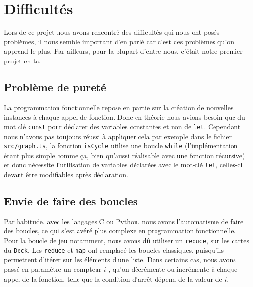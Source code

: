 \section{Difficultés}

Lors de ce projet nous avons rencontré des difficultés qui nous ont posés problèmes, il nous semble important d'en parlé car c'est des problèmes qu'on apprend le plus. Par ailleurs, pour la plupart d'entre nous, c'était notre premier projet en ts.

\subsection{Problème de pureté}

La programmation fonctionnelle repose en partie sur la création de nouvelles instances à chaque appel de fonction. Donc en théorie nous avions besoin que du mot clé \texttt{const} pour déclarer des variables constantes et non de \texttt{let}. Cependant nous n'avons pas toujours réussi à appliquer cela par exemple dans le fichier \texttt{src/graph.ts}, la fonction \texttt{isCycle} utilise une boucle \texttt{while} (l'implémentation étant plus simple comme ça, bien qu'aussi réalisable avec une fonction récursive) et donc nécessite l'utilisation de variables déclarées avec le mot-clé \texttt{let}, celles-ci devant être modifiables après déclaration.

\subsection{Envie de faire des boucles}
Par habitude, avec les langages C ou Python, nous avons l'automatisme de faire des boucles, ce qui s'est avéré plus complexe en programmation fonctionnelle. Pour la boucle de jeu notamment, nous avons dû utiliser un \texttt{reduce}, sur les cartes du \texttt{Deck}. Les \texttt{reduce} et \texttt{map} ont remplacé les boucles classiques, puisqu'ils permettent d'itérer sur les éléments d'une liste. Dans certains cas, nous avons passé en paramètre un compteur $i$ , qu'on décrémente ou incrémente à chaque appel de la fonction, telle que la condition d'arrêt dépend de la valeur de $i$. 


